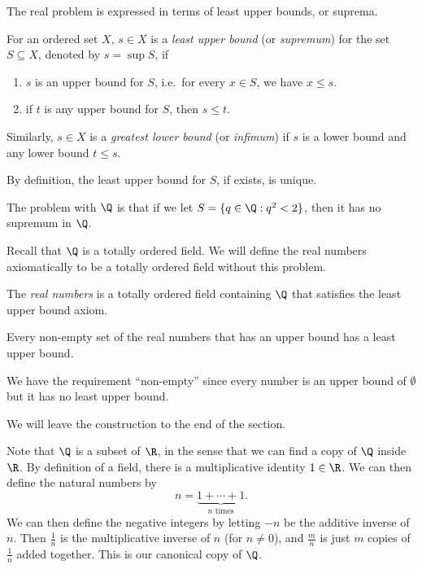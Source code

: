 \documentclass[a4paper]{article}
\begin{document}
The real problem is expressed in terms of least upper bounds, or suprema.

\begin{defi}
  For an ordered set $X$, $s\in X$ is a \emph{least upper bound} (or \emph{supremum}) for the set $S\subseteq X$, denoted by $s = \sup S$, if
  \begin{enumerate}
    \item $s$ is an upper bound for $S$, i.e.\ for every $x \in S$, we have $x \leq s$.
    \item if $t$ is any upper bound for $S$, then $s \leq t$.
  \end{enumerate}
  Similarly, $s\in X$ is a \emph{greatest lower bound} (or \emph{infimum}) if $s$ is a lower bound and any lower bound $t \leq s$.
\end{defi}
By definition, the least upper bound for $S$, if exists, is unique.

The problem with $\Q$ is that if we let $S = \{q\in \Q: q^2 < 2\}$, then it has no supremum in $\Q$.

Recall that $\Q$ is a totally ordered field. We will define the real numbers axiomatically to be a totally ordered field without this problem.
\begin{defi}
  The \emph{real numbers} is a totally ordered field containing $\Q$ that satisfies the least upper bound axiom.
\end{defi}

\begin{axiom}
  Every non-empty set of the real numbers that has an upper bound has a least upper bound.
\end{axiom}
We have the requirement ``non-empty'' since every number is an upper bound of $\emptyset$ but it has no least upper bound.

We will leave the construction to the end of the section.

Note that $\Q$ is a subset of $\R$, in the sense that we can find a copy of $\Q$ inside $\R$. By definition of a field, there is a multiplicative identity $1 \in \R$. We can then define the natural numbers by
\[
  n = \underbrace{1 + \cdots + 1}_{n\text{ times}}.
\]
We can then define the negative integers by letting $-n$ be the additive inverse of $n$. Then $\frac{1}{n}$ is the multiplicative inverse of $n$ (for $n \not= 0$), and $\frac{m}{n}$ is just $m$ copies of $\frac{1}{n}$ added together. This is our canonical copy of $\Q$.
\end{document}
